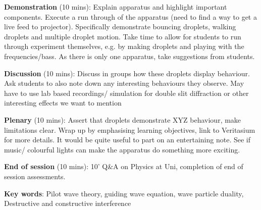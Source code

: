 \noindent \textbf{Demonstration} (10 mins): Explain apparatus and highlight important components. Execute a run through of the apparatus (need to find a way to get a live feed to projector). Specifically demonstrate bouncing droplets, walking droplets and multiple droplet motion. Take time to allow for students to run through experiment themselves, e.g. by making droplets and playing with the frequencies/bass. As there is only one apparatus, take suggestions from students. 

\noindent \textbf{Discussion} (10 mins): Discuss in groups how these droplets display behaviour. Ask students to also note down any interesting behaviours they observe. May have to use lab based recordings/ simulation for double slit diffraction or other interesting effects we want to mention

\noindent \textbf{Plenary} (10 mins): Assert that droplets demonstrate XYZ behaviour, make limitations clear. Wrap up by emphasising learning objectives, link to Veritasium for more details. It would be quite useful to part on an entertaining note. See if music/ colourful lights can make the apparatus do something more exciting. 

\noindent \textbf{End of session} (10 mins): 10' Q&A on Physics at Uni, completion of end of session assessments. 



\noindent \textbf{Key words}: Pilot wave theory, guiding wave equation, wave particle duality, Destructive and constructive interference

